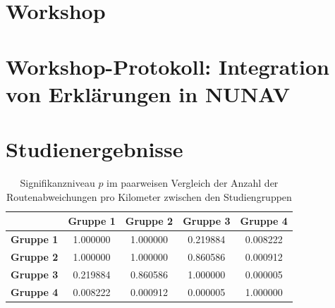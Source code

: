 \section{Workshop}

\section{Workshop-Protokoll: Integration von Erklärungen in NUNAV}
\label{sec:appendix_workshop_protocol}

\section{Studienergebnisse}
\label{sec:appendix_study_results}

\begin{table}
    \begin{center}
        \begin{tabular}{|c|c|c|c|c|}
            \hline
            & \textbf{Gruppe 1} & \textbf{Gruppe 2} & \textbf{Gruppe 3} & \textbf{Gruppe 4} \\ \hline
            \textbf{Gruppe 1}   & 1.000000 & 1.000000 & 0.219884 & 0.008222 \\ \hline
            \textbf{Gruppe 2}   & 1.000000 & 1.000000 & 0.860586 & 0.000912 \\ \hline
            \textbf{Gruppe 3}   & 0.219884 & 0.860586 & 1.000000 & 0.000005 \\ \hline
            \textbf{Gruppe 4}   & 0.008222 & 0.000912 & 0.000005 & 1.000000 \\ \hline
        \end{tabular}
    \end{center}
    
    \caption{Signifikanzniveau $ p $ im paarweisen Vergleich der Anzahl der Routenabweichungen pro Kilometer zwischen den Studiengruppen }
    \label{tab:study_offroute_significance_results}
\end{table}